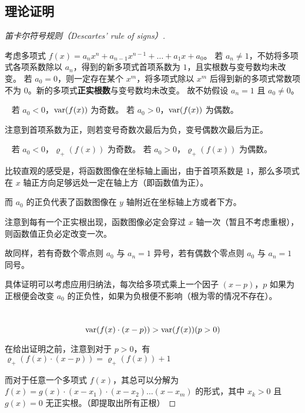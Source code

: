 \subsection{理论证明}

\begin{proof}[笛卡尔符号规则（Descartes' rule of signs）]~

    考虑多项式 $f(x) = a_nx^n + a_{n-1}x^{n-1} + \dots + a_1x + a_0$。
    若 $a_n \neq 1$，不妨将多项式各项系数除以 $a_n$，得到的新多项式首项系数为 $1$，且实根数与变号数均未改变。
    若 $a_0 = 0$，则一定存在某个 $x^m$，将多项式除以 $x^m$ 后得到新的多项式常数项不为 $0$。新的多项式\textbf{正实根数}与变号数均未改变。
    故不妨假设 $a_n=1$ 且 $a_0 \neq 0$。

    \begin{lemma}[]~
        若 $a_0 < 0$，$\mathrm{var}(f(x))$ 为奇数。
        若 $a_0 > 0$，$\mathrm{var}(f(x))$ 为偶数。
    \end{lemma}

    注意到首项系数为正，则若变号奇数次最后为负，变号偶数次最后为正。

    \begin{lemma}[]~
        若 $a_0 < 0$，$\varrho_+(f(x))$ 为奇数。
        若 $a_0 > 0$，$\varrho_+(f(x))$ 为偶数。
    \end{lemma}

    比较直观的感受是，将函数图像在坐标轴上画出，由于首项系数是 $1$，那么多项式在 $x$ 轴正方向足够远处一定在轴上方（即函数值为正）。

    而 $a_0$ 的正负代表了函数图像在 $y$ 轴附近在坐标轴上方或者下方。

    注意到每有一个正实根出现，函数图像必定会穿过 $x$ 轴一次（暂且不考虑重根），则函数值正负必定改变一次。

    故同样，若有奇数个零点则 $a_0$ 与 $a_n=1$ 异号，若有偶数个零点则 $a_0$ 与 $a_n=1$ 同号。

    具体证明可以考虑应用归纳法，每次给多项式乘上一个因子 $(x-p)$，$p$ 如果为正根便会改变 $a_0$ 的正负性，如果为负根便不影响（根为零的情况不存在）。
    
    \begin{lemma}[]~
        $$
        \mathrm{var}(f(x) \cdot (x-p)) > \mathrm{var}(f(x)) (p > 0)
        $$
    \end{lemma}

    在给出证明之前，注意到对于 $p > 0$，有 $\varrho_+(f(x) \cdot (x-p)) = \varrho_+(f(x)) + 1$

    而对于任意一个多项式 $f(x)$，其总可以分解为 $f(x) = g(x) \cdot (x-x_1) \cdot (x-x_2) \dots (x-x_m)$ 的形式，其中 $x_k > 0$ 且 $g(x)=0$ 无正实根。（即提取出所有正根）


\end{proof}

